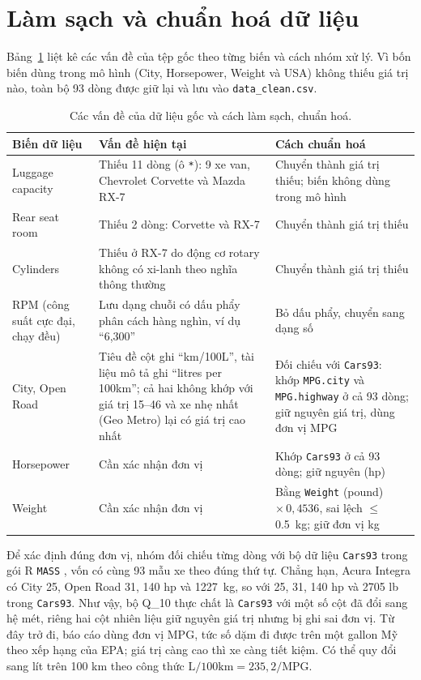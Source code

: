 \documentclass[12pt,a4paper]{report}
\begin{document}
\section{Làm sạch và chuẩn hoá dữ liệu}
\label{sec:cleaning}

Bảng~\ref{tab:cleaning} liệt kê các vấn đề của tệp gốc theo từng biến và cách
nhóm xử lý. Vì bốn biến dùng trong mô hình (City, Horsepower, Weight và USA)
không thiếu giá trị nào, toàn bộ 93 dòng được giữ lại và lưu vào
\texttt{data\_clean.csv}.

\begin{table}[tp]
  \centering
  \small
  \caption{Các vấn đề của dữ liệu gốc và cách làm sạch, chuẩn hoá.}
  \label{tab:cleaning}
  \begin{tabular}{>{\raggedright}p{2.8cm}>{\raggedright}p{6.4cm}>{\raggedright\arraybackslash}p{5.6cm}}
    \toprule
    Biến dữ liệu & Vấn đề hiện tại & Cách chuẩn hoá \\
    \midrule
    Luggage capacity & Thiếu 11 dòng (ô \texttt{*}): 9 xe van, Chevrolet Corvette và Mazda RX-7
      & Chuyển thành giá trị thiếu; biến không dùng trong mô hình \\
    Rear seat room & Thiếu 2 dòng: Corvette và RX-7
      & Chuyển thành giá trị thiếu \\
    Cylinders & Thiếu ở RX-7 do động cơ rotary không có xi-lanh theo nghĩa thông thường
      & Chuyển thành giá trị thiếu \\
    RPM (công suất cực đại, chạy đều) & Lưu dạng chuỗi có dấu phẩy phân cách hàng nghìn, ví dụ ``6,300''
      & Bỏ dấu phẩy, chuyển sang dạng số \\
    City, Open Road & Tiêu đề cột ghi ``km/100L'', tài liệu mô tả ghi ``litres per 100km''; cả hai không khớp với giá trị 15--46 và xe nhẹ nhất (Geo Metro) lại có giá trị cao nhất
      & Đối chiếu với \texttt{Cars93}: khớp \texttt{MPG.city} và \texttt{MPG.highway} ở cả 93 dòng; giữ nguyên giá trị, dùng đơn vị MPG \\
    Horsepower & Cần xác nhận đơn vị
      & Khớp \texttt{Cars93} ở cả 93 dòng; giữ nguyên (hp) \\
    Weight & Cần xác nhận đơn vị
      & Bằng \texttt{Weight} (pound) $\times\,0{,}4536$, sai lệch $\le$ \SI{0.5}{kg}; giữ đơn vị kg \\
    \bottomrule
  \end{tabular}
\end{table}

Để xác định đúng đơn vị, nhóm đối chiếu từng dòng với bộ dữ liệu
\texttt{Cars93} trong gói R \texttt{MASS} \cite{lock1993cars, mass2002cars93},
vốn có cùng 93 mẫu xe theo đúng thứ tự. Chẳng hạn, Acura Integra có City 25,
Open Road 31, 140 hp và \SI{1227}{kg}, so với 25, 31, 140 hp và 2705 lb trong
\texttt{Cars93}. Như vậy, bộ Q\_10 thực chất là \texttt{Cars93} với một số cột
đã đổi sang hệ mét, riêng hai cột nhiên liệu giữ nguyên giá trị nhưng bị ghi sai
đơn vị. Từ đây trở đi, báo cáo dùng đơn vị MPG, tức số dặm đi được trên một
gallon Mỹ theo xếp hạng của EPA; giá trị càng cao thì xe càng tiết kiệm. Có thể
quy đổi sang lít trên 100 km theo công thức
$\text{L/100km} = 235{,}2 / \text{MPG}$.
\end{document}
